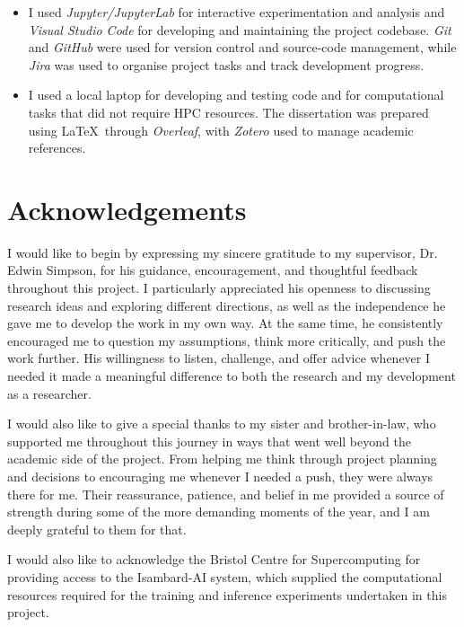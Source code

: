 \documentclass[ %
                    author={Aman Kumar Singh},
                supervisor={Dr. Edwin Simpson},
                    degree={MSc},
                     title={Quality-Aware Knowledge Distillation of Large Language Models for Efficient Personalised Clinical Report Generation},
                  subtitle={},
                      type={},
                      year={2021}]{dissertation}
\begin{document}
\begin{itemize}
\item I used \textit{Jupyter/JupyterLab} for interactive experimentation and analysis and \textit{Visual Studio Code} for developing and maintaining the project codebase. \textit{Git} and \textit{GitHub} were used for version control and source-code management, while \textit{Jira} was used to organise project tasks and track development progress.

\item I used a local laptop for developing and testing code and for computational tasks that did not require HPC resources. The dissertation was prepared using \LaTeX\ through \textit{Overleaf}, with \textit{Zotero} used to manage academic references.

\end{itemize}






\chapter*{Acknowledgements}

I would like to begin by expressing my sincere gratitude to my supervisor, Dr. Edwin Simpson, for his guidance, encouragement, and thoughtful feedback throughout this project. I particularly appreciated his openness to discussing research ideas and exploring different directions, as well as the independence he gave me to develop the work in my own way. At the same time, he consistently encouraged me to question my assumptions, think more critically, and push the work further. His willingness to listen, challenge, and offer advice whenever I needed it made a meaningful difference to both the research and my development as a researcher.

I would also like to give a special thanks to my sister and brother-in-law, who supported me throughout this journey in ways that went well beyond the academic side of the project. From helping me think through project planning and decisions to encouraging me whenever I needed a push, they were always there for me. Their reassurance, patience, and belief in me provided a source of strength during some of the more demanding moments of the year, and I am deeply grateful to them for that.

I would also like to acknowledge the Bristol Centre for Supercomputing for providing access to the Isambard-AI system, which supplied the computational resources required for the training and inference experiments undertaken in this project.
\end{document}
